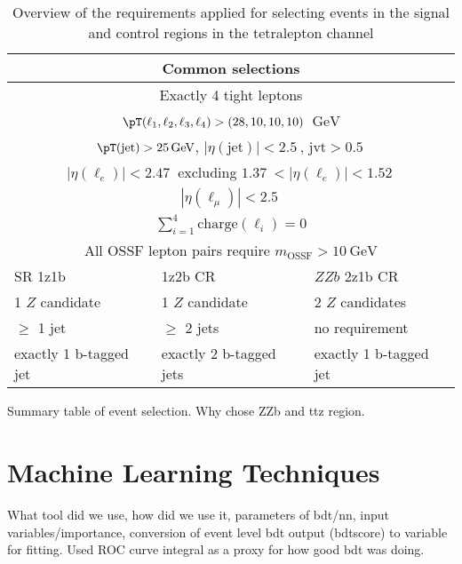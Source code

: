 \begin{table}[htbp]
	
	
	\centering
	\begin{tabular}{m{3.5cm}m{3.5cm}m{3.5cm}}
		\toprule
		\multicolumn{3}{c}{Common selections}  \\
		\midrule
		\multicolumn{3}{c}{Exactly 4 tight leptons}   \\
		\multicolumn{3}{c}{$\pT(\ell_1,\ell_2,\ell_3,\ell_4) > (28,10,10,10)$ $\SI{}{\GeV}$}   \\
		\multicolumn{3}{c}{$\pT(\text{jet})> \SI{25}{\GeV}$, $|\eta(\text{jet})| < \SI{2.5}{}$, $\text{jvt} > \SI{0.5}{}$}   \\
		\multicolumn{3}{c}{$|\eta(\ell_e)| < \SI{2.47}{}$ excluding $\SI{1.37}{} < |\eta(\ell_e)| < \SI{1.52}{}$}   \\
		\multicolumn{3}{c}{$|\eta(\ell_\mu)| < \SI{2.5}{}$}   \\
		\multicolumn{3}{c}{$\displaystyle\sum_{i=1}^{4} \text{charge}(\ell_i) = 0$}   \\
		\multicolumn{3}{c}{All OSSF lepton pairs require $m_{\text{OSSF}} > \SI{10}{\GeV}$}   \\
		\bottomrule
		SR 1z1b & \ttZ 1z2b CR & $ZZb$ 2z1b CR\\
		\midrule
		1 $Z$ candidate & 1 $Z$ candidate & 2 $Z$ candidates\\
		$\geq$ 1 jet & $\geq$ 2 jets & no requirement\\
		exactly 1 b-tagged jet & exactly 2 b-tagged jets & exactly 1 b-tagged jet\\
		\bottomrule
	\end{tabular}
	\caption{
		Overview of the requirements applied for selecting events in the signal and control regions in the tetralepton channel
	}%
	\label{tab:4Lep-cutsummary}
\end{table}




Summary table of event selection. Why chose ZZb and ttz region. 
\section{Machine Learning Techniques}
What tool did we use, how did we use it, parameters of bdt/nn, input variables/importance, conversion of event level bdt output (bdtscore) to variable for fitting. Used ROC curve integral as a proxy for how good bdt was doing. 
